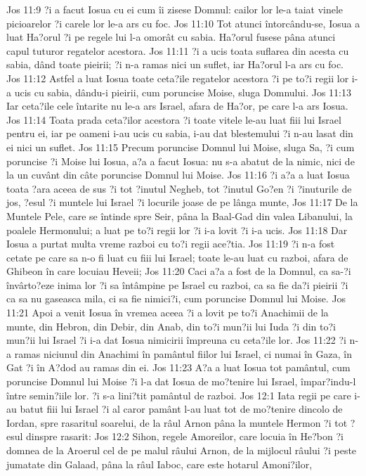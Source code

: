 Jos 11:9  ?i a facut Iosua cu ei cum îi zisese Domnul: cailor lor le-a taiat vinele picioarelor ?i carele lor le-a ars cu foc.
Jos 11:10  Tot atunci întorcându-se, Iosua a luat Ha?orul ?i pe regele lui l-a omorât cu sabia. Ha?orul fusese pâna atunci capul tuturor regatelor acestora.
Jos 11:11  ?i a ucis toata suflarea din acesta cu sabia, dând toate pieirii; ?i n-a ramas nici un suflet, iar Ha?orul l-a ars cu foc.
Jos 11:12  Astfel a luat Iosua toate ceta?ile regatelor acestora ?i pe to?i regii lor i-a ucis cu sabia, dându-i pieirii, cum poruncise Moise, sluga Domnului.
Jos 11:13  Iar ceta?ile cele întarite nu le-a ars Israel, afara de Ha?or, pe care l-a ars Iosua.
Jos 11:14  Toata prada ceta?ilor acestora ?i toate vitele le-au luat fiii lui Israel pentru ei, iar pe oameni i-au ucis cu sabia, i-au dat blestemului ?i n-au lasat din ei nici un suflet.
Jos 11:15  Precum poruncise Domnul lui Moise, sluga Sa, ?i cum poruncise ?i Moise lui Iosua, a?a a facut Iosua: nu s-a abatut de la nimic, nici de la un cuvânt din câte poruncise Domnul lui Moise.
Jos 11:16  ?i a?a a luat Iosua toata ?ara aceea de sus ?i tot ?inutul Negheb, tot ?inutul Go?en ?i ?inuturile de jos, ?esul ?i muntele lui Israel ?i locurile joase de pe lânga munte,
Jos 11:17  De la Muntele Pele, care se întinde spre Seir, pâna la Baal-Gad din valea Libanului, la poalele Hermonului; a luat pe to?i regii lor ?i i-a lovit ?i i-a ucis.
Jos 11:18  Dar Iosua a purtat multa vreme razboi cu to?i regii ace?tia.
Jos 11:19  ?i n-a fost cetate pe care sa n-o fi luat cu fiii lui Israel; toate le-au luat cu razboi, afara de Ghibeon în care locuiau Heveii;
Jos 11:20  Caci a?a a fost de la Domnul, ca sa-?i învârto?eze inima lor ?i sa întâmpine pe Israel cu razboi, ca sa fie da?i pieirii ?i ca sa nu gaseasca mila, ci sa fie nimici?i, cum poruncise Domnul lui Moise.
Jos 11:21  Apoi a venit Iosua în vremea aceea ?i a lovit pe to?i Anachimii de la munte, din Hebron, din Debir, din Anab, din to?i mun?ii lui Iuda ?i din to?i mun?ii lui Israel ?i i-a dat Iosua nimicirii împreuna cu ceta?ile lor.
Jos 11:22  ?i n-a ramas niciunul din Anachimi în pamântul fiilor lui Israel, ci numai în Gaza, în Gat ?i în A?dod au ramas din ei.
Jos 11:23  A?a a luat Iosua tot pamântul, cum poruncise Domnul lui Moise ?i l-a dat Iosua de mo?tenire lui Israel, împar?indu-l între semin?iile lor. ?i s-a lini?tit pamântul de razboi.
Jos 12:1  Iata regii pe care i-au batut fiii lui Israel ?i al caror pamânt l-au luat tot de mo?tenire dincolo de Iordan, spre rasaritul soarelui, de la râul Arnon pâna la muntele Hermon ?i tot ?esul dinspre rasarit:
Jos 12:2  Sihon, regele Amoreilor, care locuia în He?bon ?i domnea de la Aroerul cel de pe malul râului Arnon, de la mijlocul râului ?i peste jumatate din Galaad, pâna la râul Iaboc, care este hotarul Amoni?ilor,
